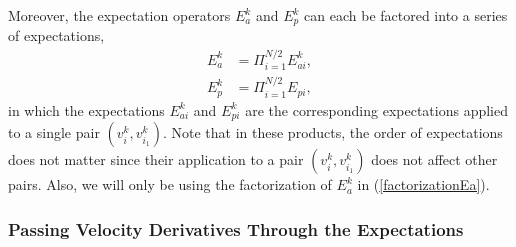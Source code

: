 \documentclass[12pt,nopreprintline]{elsarticle}
\begin{document}
Moreover, the  expectation operators $E_a^k$ and $E_p^k$ can each be factored into a series of  expectations,
\begin{subequations}
\begin{align}
E_a^k &= \Pi_{i=1}^{N/2}  E_{ai}^k, \label{factorizationEa} \\
E_p^k &= \Pi_{i=1}^{N/2}  E_{pi} ,\label{factorizationEp}
\end{align}
\end{subequations}
in which the  expectations $E_{ai}^k$ and $E_{pi}^k$ are the corresponding expectations applied to a single pair $(v_i^{k}, v_{i_1}^{k})$. Note that in these products, the order of expectations does not matter since their application to a pair $(v_i^{k}, v_{i_1}^{k})$ does not affect other pairs. Also, we will only be using the factorization of $E_a^k$ in (\ref{factorizationEa}).


\subsubsection{Passing Velocity Derivatives Through the Expectations}\label{section:Formulation}
\end{document}
